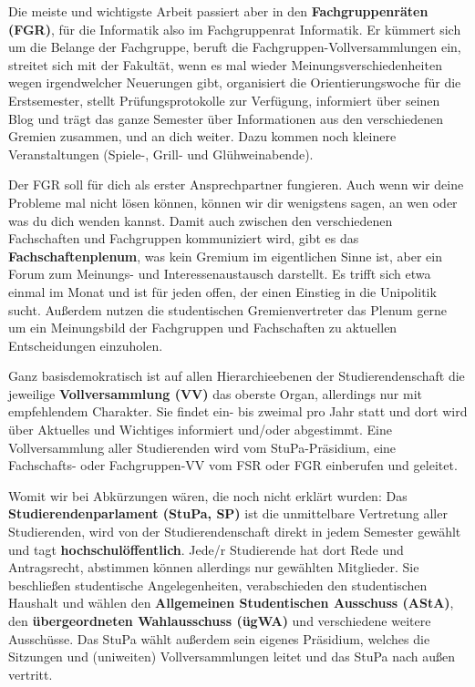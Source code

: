 \begin{figure*}[bt]
\end{figure*}

Die meiste und wichtigste Arbeit passiert aber in den \textbf{Fachgruppenräten (FGR)}, für die Informatik also im Fachgruppenrat Informatik. Er kümmert sich um die Belange der Fachgruppe, beruft die Fachgruppen-Vollversammlungen ein, streitet sich mit der Fakultät, wenn es mal wieder Meinungsverschiedenheiten wegen irgendwelcher Neuerungen gibt, organisiert die Orientierungswoche für die Erstsemester, stellt Prüfungsprotokolle zur Verfügung, informiert über seinen Blog \fginfoUrl und trägt das ganze Semester über Informationen aus den verschiedenen Gremien zusammen, und an dich weiter. Dazu kommen noch kleinere Veranstaltungen (Spiele-, Grill- und Glühweinabende).

Der FGR soll für dich als erster Ansprechpartner fungieren. Auch wenn wir deine Probleme mal nicht lösen können, können wir dir wenigstens sagen, an wen oder was du dich wenden kannst. Damit auch zwischen den verschiedenen Fachschaften und Fachgruppen kommuniziert wird, gibt es das \textbf{Fachschaftenplenum}, was kein Gremium im eigentlichen Sinne ist, aber ein Forum zum Meinungs- und Interessenaustausch darstellt. Es trifft sich etwa einmal im Monat und ist für jeden offen, der einen Einstieg in die Unipolitik sucht. Außerdem nutzen die studentischen Gremienvertreter das Plenum gerne um ein Meinungsbild der Fachgruppen und Fachschaften zu aktuellen Entscheidungen einzuholen.

Ganz basisdemokratisch ist auf allen Hierarchie\-ebenen der Studierendenschaft die jeweilige \textbf{Vollversammlung (VV)} das oberste Organ, allerdings nur mit empfehlendem Charakter. Sie findet ein- bis zweimal pro Jahr statt und dort wird über Aktuelles und Wichtiges informiert und/oder abgestimmt. Eine Vollversammlung aller Studierenden wird vom StuPa-Präsidium, eine Fachschafts- oder Fachgruppen-VV vom FSR oder FGR einberufen und geleitet.

Womit wir bei Abkürzungen wären, die noch nicht erklärt wurden: Das \textbf{Studierendenparlament (StuPa, SP)} ist die unmittelbare Vertretung aller Studierenden, wird von der Studierendenschaft direkt in jedem Semester gewählt und tagt \textbf{hochschulöffentlich}. Jede/r Studierende hat dort Rede und Antragsrecht, abstimmen können allerdings nur gewählten Mitglieder. Sie beschließen studentische Angelegenheiten, verabschieden den studentischen Haushalt und wählen den \textbf{Allgemeinen Studentischen Ausschuss (AStA)}, den \textbf{übergeordneten Wahlausschuss (ügWA)} und verschiedene weitere Ausschüsse. Das StuPa wählt außerdem sein eigenes Präsidium, welches die Sitzungen und (uniweiten) Vollversammlungen leitet und das StuPa nach außen  vertritt.

